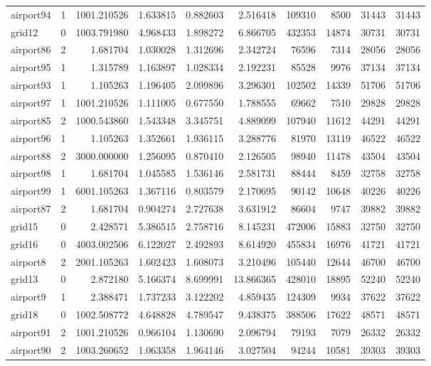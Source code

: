 \begin{longtable}{|l|r|r|r|r|r|r|r|r|r|}
airport94 & 1 & 1001.210526 & 1.633815 & 0.882603 & 2.516418 & 109310 & 8500 & 31443 & 31443 \\
grid12 & 0 & 1003.791980 & 4.968433 & 1.898272 & 6.866705 & 432353 & 14874 & 30731 & 30731 \\
airport86 & 2 & 1.681704 & 1.030028 & 1.312696 & 2.342724 & 76596 & 7314 & 28056 & 28056 \\
airport95 & 1 & 1.315789 & 1.163897 & 1.028334 & 2.192231 & 85528 & 9976 & 37134 & 37134 \\
airport93 & 1 & 1.105263 & 1.196405 & 2.099896 & 3.296301 & 102502 & 14339 & 51706 & 51706 \\
airport97 & 1 & 1001.210526 & 1.111005 & 0.677550 & 1.788555 & 69662 & 7510 & 29828 & 29828 \\
airport85 & 2 & 1000.543860 & 1.543348 & 3.345751 & 4.889099 & 107940 & 11612 & 44291 & 44291 \\
airport96 & 1 & 1.105263 & 1.352661 & 1.936115 & 3.288776 & 81970 & 13119 & 46522 & 46522 \\
airport88 & 2 & 3000.000000 & 1.256095 & 0.870410 & 2.126505 & 98940 & 11478 & 43504 & 43504 \\
airport98 & 1 & 1.681704 & 1.045585 & 1.536146 & 2.581731 & 88444 & 8459 & 32758 & 32758 \\
airport99 & 1 & 6001.105263 & 1.367116 & 0.803579 & 2.170695 & 90142 & 10648 & 40226 & 40226 \\
airport87 & 2 & 1.681704 & 0.904274 & 2.727638 & 3.631912 & 86604 & 9747 & 39882 & 39882 \\
grid15 & 0 & 2.428571 & 5.386515 & 2.758716 & 8.145231 & 472006 & 15883 & 32750 & 32750 \\
grid16 & 0 & 4003.002506 & 6.122027 & 2.492893 & 8.614920 & 455834 & 16976 & 41721 & 41721 \\
airport8 & 2 & 2001.105263 & 1.602423 & 1.608073 & 3.210496 & 105440 & 12644 & 46700 & 46700 \\
grid13 & 0 & 2.872180 & 5.166374 & 8.699991 & 13.866365 & 428010 & 18895 & 52240 & 52240 \\
airport9 & 1 & 2.388471 & 1.737233 & 3.122202 & 4.859435 & 124309 & 9934 & 37622 & 37622 \\
grid18 & 0 & 1002.508772 & 4.648828 & 4.789547 & 9.438375 & 388506 & 17622 & 48571 & 48571 \\
airport91 & 2 & 1001.210526 & 0.966104 & 1.130690 & 2.096794 & 79193 & 7079 & 26332 & 26332 \\
airport90 & 2 & 1003.260652 & 1.063358 & 1.964146 & 3.027504 & 94244 & 10581 & 39303 & 39303 \\

\end{longtable}
